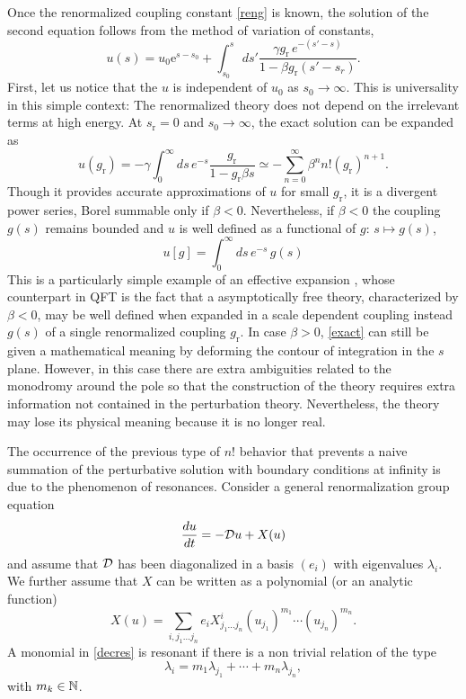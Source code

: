 \documentclass[10pt,here,feynmf]{article}
\begin{document}
Once the renormalized coupling constant \eqref{reng} is known, the solution of the second equation follows from the method of variation of constants,
\begin{equation}
u(s)=u_{0}\mathrm{e}^{s-s_{0}}+\int_{s_{0}}^{s}\,ds'
\frac{\gamma g_{\mathrm{r}}\,e^{-(s'-s)}}{1-\beta g_{\mathrm{r}}(s'-s_{r})}.\label{exact}
\end{equation}
First, let us notice that the $u$ is independent of $u_{0}$ as $s_{0}\rightarrow\infty$. This is universality in this simple context: The renormalized theory does not depend on the irrelevant terms at high energy. 
At $s_{\mathrm{r}}=0$ and $s_{0}\rightarrow\infty$, the exact solution can be expanded as
\begin{equation}
u(g_{\mathrm{r}})=-\gamma\int_{0}^{\infty}\!ds\,e^{-s}\frac{g_{\mathrm{r}}}{1-g_{\mathrm{r}}\beta
s}\simeq
-\mathop{\sum}\limits_{n=0}^{\infty}\beta^{n}n!(g_{\mathrm{r}})^{n+1}.
\end{equation}
Though it provides accurate approximations of $u$ for small $g_{\mathrm r}$, it is a divergent power series, Borel summable only if $\beta<0$. Nevertheless, if $\beta<0$ the coupling $g(s)$ remains bounded and $u$ is well defined as a functional of $g:\,s\mapsto g(s)$,
\begin{equation}
u[g]=\int_{0}^{\infty}ds\,e^{-s}\,g(s)
\end{equation}
This is a particularly simple example of an effective expansion \cite{constructive}, whose counterpart in QFT is the  fact that a asymptotically free theory, characterized by $\beta<0$, may be well defined when expanded in a scale dependent coupling instead $g(s)$ of a single renormalized coupling $g_{\mathrm{r}}$.  In case $\beta>0$, \eqref{exact} can still be given a mathematical meaning by deforming the contour of integration in the $s$ plane. However, in this case there are extra ambiguities related to the monodromy around the pole so that the construction of the theory requires extra information not contained in the perturbation theory.  Nevertheless, the theory may lose its physical meaning because it is no longer real.

The occurrence of the previous type of $n!$ behavior that prevents a naive summation of the perturbative solution with boundary conditions at infinity is due to the phenomenon of resonances. Consider a general renormalization group equation  
\begin{equation}
\frac{du}{dt}=-{\cal D}u+X(u)\label{non linear}
\end{equation}
and assume that ${\cal D}$ has been diagonalized in a basis $(e_{i})$ with eigenvalues $\lambda_{i}$. We further assume that $X$ can be written as a polynomial (or an analytic function)
\begin{equation}
X(u)=\sum_{i,j_{1}\dots j_{n}}e_{i} X^{i}_{j_{1}\dots j_{n}}
(u_{j_{1}})^{m_{1}}\cdots (u_{j_{n}})^{m_{n}}.\label{decres}
\end{equation}
A monomial in \eqref{decres} is resonant if there is a non trivial relation of the type
\begin{equation}
\lambda_{i}=m_{1}\lambda_{j_{1}}+\cdots+m_{n}\lambda_{j_{n}},\label{resonance}
\end{equation}
with $m_{k}\in{\Bbb N}$. 
\end{document}
